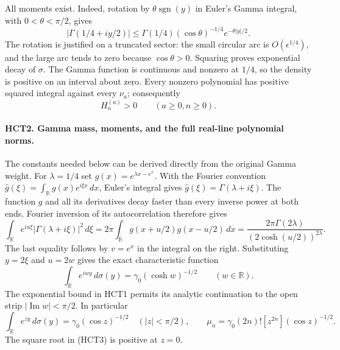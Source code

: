 \documentclass[11pt,a4paper]{article}
\begin{document}
All moments exist. Indeed, rotation by $\theta\operatorname{sgn}(y)$
in Euler's Gamma integral, with $0<\theta<\pi/2$, gives
\[
 |\Gamma(1/4+iy/2)|
 \leq \Gamma(1/4)(\cos\theta)^{-1/4}e^{-\theta|y|/2}.
\]
The rotation is justified on a truncated sector: the small circular
arc is $O(\epsilon^{1/4})$, and the large arc tends to zero because
$\cos\theta>0$. Squaring proves exponential decay of $\sigma$.
The Gamma function is continuous and nonzero at $1/4$, so the density
is positive on an interval about zero. Every nonzero polynomial has
positive squared integral against every $\nu_a$; consequently
\begin{equation}\tag{HCT2}
 H_n^{(a)}>0\qquad(a\geq0, n\geq0).
\end{equation}

\paragraph{HCT2. Gamma mass, moments, and the full real-line polynomial norms.}
The constants needed below can be derived directly from the original
Gamma weight. For $\lambda=1/4$ set $g(x)=e^{\lambda x-e^x}$.
With the Fourier convention
$\widehat g(\xi)=\int_{\mathbb R}g(x)e^{i\xi x}\,dx$, Euler's
integral gives $\widehat g(\xi)=\Gamma(\lambda+i\xi)$.
The function $g$ and all its derivatives decay faster than every
inverse power at both ends. Fourier inversion of its autocorrelation
therefore gives
\[
 \int_{\mathbb R}e^{iu\xi}|\Gamma(\lambda+i\xi)|^2\,d\xi
 =2\pi\int_{\mathbb R}g(x+u/2)g(x-u/2)\,dx
 =\frac{2\pi\Gamma(2\lambda)}{(2\cosh(u/2))^{2\lambda}}.
\]
The last equality follows by $v=e^x$ in the integral on the right.
Substituting $y=2\xi$ and $u=2w$ gives the exact characteristic
function
\[
 \int_{\mathbb R}e^{iwy}\,d\sigma(y)
 =\gamma_0(\cosh w)^{-1/2}\qquad(w\in\mathbb R).
\]
The exponential bound in HCT1 permits its analytic continuation
to the open strip $|\operatorname{Im}w|<\pi/2$. In particular
\begin{equation}\tag{HCT3}
 \int_{\mathbb R}e^{zy}\,d\sigma(y)
 =\gamma_0(\cos z)^{-1/2}\quad(|z|<\pi/2),\qquad
 \mu_n=\gamma_0(2n)![z^{2n}](\cos z)^{-1/2}.
\end{equation}
The square root in (HCT3) is positive at $z=0$.
\end{document}
